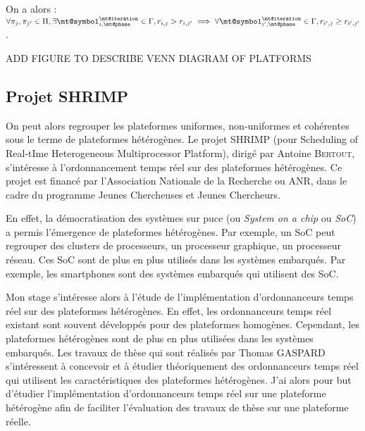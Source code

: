 On a alors : 
$\forall\proc{j},\proc{j'}\in\pset,\exists\task{i}\in\tset,\trate{i}{j}>\trate{i}{j'}\implies\forall\task{i'}\in\tset,\trate{i'}{j}\geq\trate{i'}{j'}$. 


\begin{center}
    \color{red}
    ADD FIGURE TO DESCRIBE VENN DIAGRAM OF PLATFORMS
\end{center}

\subsection{Projet SHRIMP}

On peut alors regrouper les plateformes uniformes, non-uniformes et cohérentes sous le terme de plateformes hétérogènes. Le projet SHRIMP (pour Scheduling of Real-tIme Heterogeneous Multiprocessor Platform), dirigé par Antoine \textsc{Bertout}, s'intéresse à l'ordonnancement temps réel sur des plateformes hétérogènes. Ce projet est financé par l'Association Nationale de la Recherche ou ANR, dans le cadre du programme Jeunes Chercheuses et Jeunes Chercheurs.

En effet, la démocratisation des systèmes sur puce (ou \textit{System on a chip} ou \textit{SoC}) a permis l'émergence de plateformes hétérogènes. Par exemple, un SoC peut regrouper des clusters de processeurs, un processeur graphique, un processeur réseau. Ces SoC sont de plus en plus utilisés dans les systèmes embarqués. Par exemple, les smartphones sont des systèmes embarqués qui utilisent des SoC. 

Mon stage s'intéresse alors à l'étude de l'implémentation d'ordonnanceurs temps réel sur des plateformes hétérogènes. En effet, les ordonnanceurs temps réel existant sont souvent développés pour des plateformes homogènes. Cependant, les plateformes hétérogènes sont de plus en plus utilisées dans les systèmes embarqués. Les travaux de thèse qui sont réalisés par Thomas GASPARD s'intéressent à concevoir et à étudier théoriquement des ordonnanceurs temps réel qui utilisent les caractéristiques des plateformes hétérogènes. J'ai alors pour but d'étudier l'implémentation d'ordonnanceurs temps réel sur une plateforme hétérogène afin de faciliter l'évaluation des travaux de thèse sur une plateforme réelle.